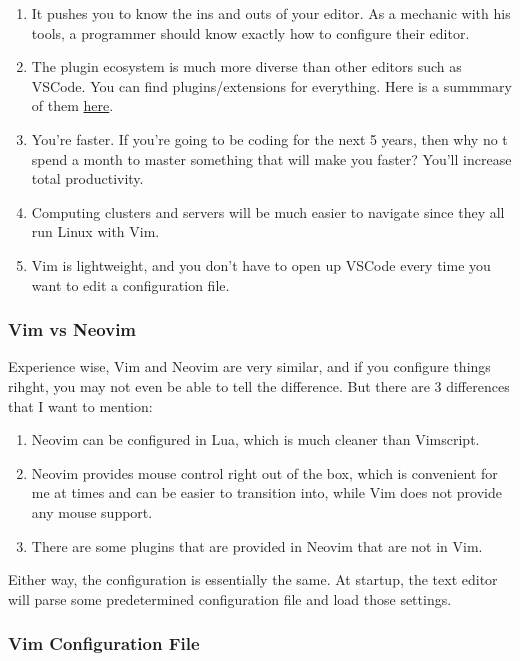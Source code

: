 \documentclass{article}
\begin{document}
    \begin{enumerate}
      \item It pushes you to know the ins and outs of your editor. As a mechanic with his tools, a programmer should know exactly how to configure their editor.  
      \item The plugin ecosystem is much more diverse than other editors such as VSCode. You can find plugins/extensions for everything. Here is a summmary of them \href{https://github.com/rockerBOO/awesome-neovim\#neovim-lua-development}{here}. 
      \item You're faster. If you're going to be coding for the next 5 years, then why no t spend a month to master something that will make you faster? You'll increase total productivity. 
      \item Computing clusters and servers will be much easier to navigate since they all run Linux with Vim. 
      \item Vim is lightweight, and you don't have to open up VSCode every time you want to edit a configuration file.  
    \end{enumerate}
  
    \subsubsection{Vim vs Neovim}

      Experience wise, Vim and Neovim are very similar, and if you configure things rihght, you may not even be able to tell the difference. But there are 3 differences that I want to mention: 
      
      \begin{enumerate}
        \item Neovim can be configured in Lua, which is much cleaner than Vimscript. 
        \item Neovim provides mouse control right out of the box, which is convenient for me at times and can be easier to transition into, while Vim does not provide any mouse support. 
        \item There are some plugins that are provided in Neovim that are not in Vim. 
      \end{enumerate}

      Either way, the configuration is essentially the same. At startup, the text editor will parse some predetermined configuration file and load those settings. 

    \subsubsection{Vim Configuration File}
\end{document}
